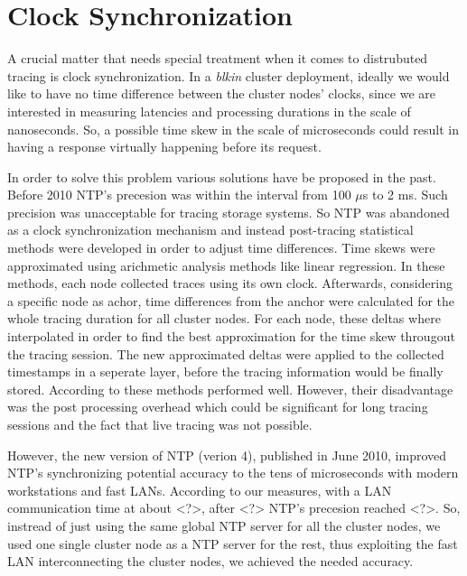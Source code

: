 \documentclass[a4paper,10pt,twocolumn]{article}
\begin{document}
%

\section{Clock Synchronization}

A crucial matter that needs special treatment when it comes to distrubuted 
tracing is clock synchronization. In a \emph{blkin} cluster deployment, ideally
we would like to have no time difference between the cluster nodes' clocks, 
since we are interested in measuring latencies and processing durations in the 
scale of nanoseconds. So, a possible time skew in the scale of microseconds 
could result in having a response virtually happening before its request.

In order to solve this problem various solutions have be proposed in the past.
Before 2010 NTP's precesion was within the interval from 100 $\mu$s to 2 ms. 
Such precision was unacceptable for tracing storage systems. So NTP was 
abandoned as a clock synchronization mechanism and instead post-tracing 
statistical methods were developed in order to adjust time differences. Time 
skews were approximated using arichmetic analysis methods like linear 
regression. In these methods, each node collected traces using its own clock.
Afterwards, considering a specific node as achor, time differences from the 
anchor were calculated for the whole tracing duration for all cluster nodes. 
For each node, these deltas where interpolated in order to find the best 
approximation for the time skew througout the tracing session. The new 
approximated deltas were applied to the collected timestamps in a seperate 
layer, before the tracing information would be finally stored. According to 
\cite{hp} these methods performed well. However, their disadvantage was the post
processing overhead which could be significant for long tracing sessions and the
fact that live tracing was not possible.

However, the new version of NTP (verion 4), published in June 2010, improved 
NTP's synchronizing potential accuracy to the tens of microseconds with modern 
workstations and fast LANs. According to our measures, with a LAN communication
time at about <?>, after <?> NTP's precesion reached <?>.
So, instread of just using the same global NTP server for all the cluster nodes,
we used one single cluster node as a NTP server for the rest, thus exploiting 
the fast LAN  interconnecting the cluster nodes, we achieved the needed accuracy.
 
\end{document}
